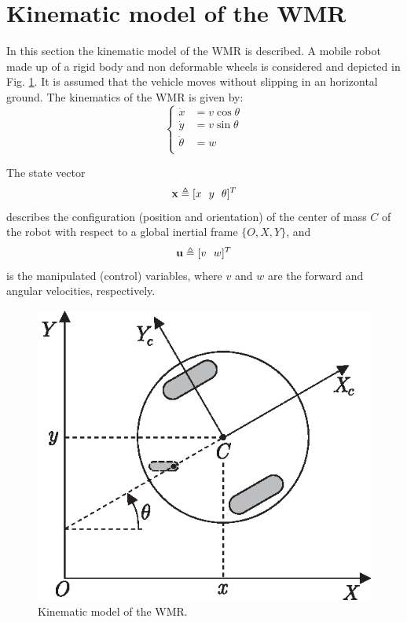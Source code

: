 \documentclass[twocolumn]{IEEEtran} %
\begin{document}
\section{Kinematic model of the WMR}\label{sec:model}
In this section the kinematic model of the WMR is described. A mobile robot made up of a rigid body and non deformable wheels is considered and depicted in Fig. \ref{fig:robot}. It is assumed that the vehicle moves without slipping in an horizontal ground. The kinematics of the WMR is given by:
\begin{equation}\label{eqn:model}
	\left\{
		\begin{aligned}
			\dot x	  &= v\cos\theta \\
			\dot y	  &= v\sin\theta \\
			\dot \theta &= w \\
		\end{aligned}
	\right.
\end{equation}

The state vector
\begin{equation*}
	{\bf x}\triangleq[x~~y~~\theta]^T
\end{equation*}
describes the configuration (position and orientation) of the center of mass $C$ of the robot with respect to a global inertial frame $\{O,X,Y\}$, and
\begin{equation*}
	{\bf u}\triangleq[v~~w]^T
\end{equation*}
is the manipulated (control) variables, where $v$ and $w$ are the forward and angular velocities, respectively.
\begin{figure}[t]\begin{center}
    \includegraphics[width=.67\linewidth]{Figures/robot.eps}
    \caption{Kinematic model of the WMR.}
    \label{fig:robot}
\end{center}\end{figure}
\end{document}
